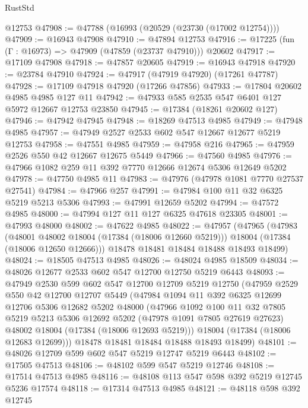 \begin{lexlean}{RustStd}
\begin{coremodule}
    @12753
@47908 := @47788 (@16993 (@20529 (@23730 (@17002 @12754))))
@47909 := @16943 @47908
@47910 := @47894 @12753
@47916 := @17225 (fun (Γ : @16973) => @47909 (@47859 (@23737 @47910))) @20602
@47917 := @17109 @47908
@47918 := @47857 @20605
@47919 := @16943 @47918
@47920 := @23784 @47910
@47924 := @47917 (@47919 @47920) (@17261 @47787)
@47928 := @17109 @47918 @47920 (@17266 @47856)
@47933 := @17804 @20602 @4985 @4985 @127 @11
@47942 := @47933 @585 @2535 @547 @6401 @127 @5972 @12667 @12753 @23850
@47945 := @17384 (@18261 @20602 @127)
@47946 := @47942 @47945
@47948 := @18269 @47513 @4985
@47949 := @47948 @4985
@47957 := @47949 @2527 @2533 @602 @547 @12667 @12677 @5219 @12753
@47958 := @47551 @4985
@47959 := @47958 @216
@47965 := @47959 @2526 @550 @42 @12667 @12675 @5449
@47966 := @47560 @4985
@47976 := @47966 @1082 @259 @11 @392 @7770 @12666 @12674 @5306 @12649 @5202
@47978 := @47750 @4985 @11
@47983 := @47976 (@47978 @1081 @7770 @27537 @27541)
@47984 := @47966 @257
@47991 := @47984 @100 @11 @32 @6325 @5219 @5213 @5306
@47993 := @47991 @12659 @5202
@47994 := @47572 @4985
@48000 := @47994 @127 @11 @127 @6325 @47618 @23305
@48001 := @47993 @48000
@48002 := @47622 @4985
@48022 := @47957
    (@47965
      (@47983
        (@48001 @48002 @18004 (@17384 (@18006 @12660 @5219)))
        @18004
        (@17384 (@18006 @12650 @12666)))
      @18478
      @18481
      @18484
      @18488
      @18493
      @18499)
@48024 := @18505 @47513 @4985
@48026 := @48024 @4985 @18509
@48034 := @48026 @12677 @2533 @602 @547 @12700 @12750 @5219 @6443
@48093 := @47949
    @2530
    @599
    @602
    @547
    @12700
    @12709
    @5219
    @12750
    (@47959
      @2529
      @550
      @42
      @12700
      @12707
      @5449
      (@47984
        @1094
        @11
        @392
        @6325
        @12699
        @12706
        @5306
        @12682
        @5202
        @48000
        (@47966
          @1092
          @100
          @11
          @32
          @7805
          @5219
          @5213
          @5306
          @12692
          @5202
          (@47978 @1091 @7805 @27619 @27623)
          @48002
          @18004
          (@17384 (@18006 @12693 @5219)))
        @18004
        (@17384 (@18006 @12683 @12699)))
      @18478
      @18481
      @18484
      @18488
      @18493
      @18499)
@48101 := @48026 @12709 @599 @602 @547 @5219 @12747 @5219 @6443
@48102 := @17505 @47513
@48106 := @48102 @599 @547 @5219 @12746
@48108 := @17514 @47513 @4985
@48116 := @48108 @113 @547 @598 @392 @5219 @12745 @5236 @17574
@48118 := @17314 @47513 @4985
@48121 := @48118 @598 @392 @12745

\end{coremodule}
\end{lexlean}
